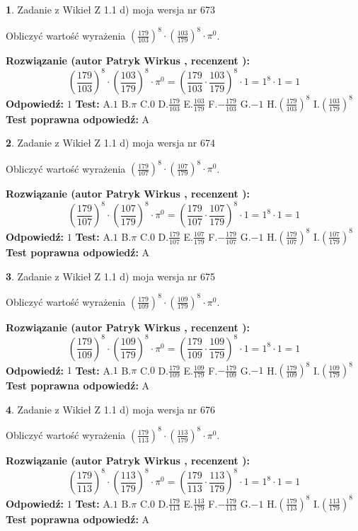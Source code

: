\documentclass[12pt, a4paper]{article}
\theoremstyle{definition} %
\newtheorem{zad}{}
\newcommand{\zadStart}[1]{\begin{zad}#1\newline}
\newcommand{\zadStop}{\end{zad}}
\newcommand{\rozwStart}[2]{\noindent \textbf{Rozwiązanie (autor #1 , recenzent #2): }\newline}
\newcommand{\rozwStop}{\newline}
\newcommand{\odpStart}{\noindent \textbf{Odpowiedź:}\newline}
\newcommand{\odpStop}{\newline}
\newcommand{\testStart}{\noindent \textbf{Test:}\newline}
\newcommand{\testStop}{\newline}
\newcommand{\kluczStart}{\noindent \textbf{Test poprawna odpowiedź:}\newline}
\newcommand{\kluczStop}{\newline}
\begin{document}
\zadStart{Zadanie z Wikieł Z 1.1 d) moja wersja nr 673}

Obliczyć wartość wyrażenia $(\frac{179}{103})^{8} \cdot (\frac{103}{179})^{8} \cdot \pi^{0}$.
\zadStop
\rozwStart{Patryk Wirkus}{}
$$(\frac{179}{103})^{8} \cdot (\frac{103}{179})^{8} \cdot \pi^{0} = (\frac{179}{103} \cdot \frac{103}{179})^{8} \cdot 1 = 1^{8} \cdot 1 = 1$$
\rozwStop
\odpStart
$1$
\odpStop
\testStart
A.$1$ B.$\pi$ C.$0$ D.$\frac{179}{103}$ E.$\frac{103}{179}$
F.$-\frac{179}{103}$ G.$-1$
H.$(\frac{179}{103})^{8}$
I.$(\frac{103}{179})^{8}$
\testStop
\kluczStart
A
\kluczStop



\zadStart{Zadanie z Wikieł Z 1.1 d) moja wersja nr 674}

Obliczyć wartość wyrażenia $(\frac{179}{107})^{8} \cdot (\frac{107}{179})^{8} \cdot \pi^{0}$.
\zadStop
\rozwStart{Patryk Wirkus}{}
$$(\frac{179}{107})^{8} \cdot (\frac{107}{179})^{8} \cdot \pi^{0} = (\frac{179}{107} \cdot \frac{107}{179})^{8} \cdot 1 = 1^{8} \cdot 1 = 1$$
\rozwStop
\odpStart
$1$
\odpStop
\testStart
A.$1$ B.$\pi$ C.$0$ D.$\frac{179}{107}$ E.$\frac{107}{179}$
F.$-\frac{179}{107}$ G.$-1$
H.$(\frac{179}{107})^{8}$
I.$(\frac{107}{179})^{8}$
\testStop
\kluczStart
A
\kluczStop



\zadStart{Zadanie z Wikieł Z 1.1 d) moja wersja nr 675}

Obliczyć wartość wyrażenia $(\frac{179}{109})^{8} \cdot (\frac{109}{179})^{8} \cdot \pi^{0}$.
\zadStop
\rozwStart{Patryk Wirkus}{}
$$(\frac{179}{109})^{8} \cdot (\frac{109}{179})^{8} \cdot \pi^{0} = (\frac{179}{109} \cdot \frac{109}{179})^{8} \cdot 1 = 1^{8} \cdot 1 = 1$$
\rozwStop
\odpStart
$1$
\odpStop
\testStart
A.$1$ B.$\pi$ C.$0$ D.$\frac{179}{109}$ E.$\frac{109}{179}$
F.$-\frac{179}{109}$ G.$-1$
H.$(\frac{179}{109})^{8}$
I.$(\frac{109}{179})^{8}$
\testStop
\kluczStart
A
\kluczStop



\zadStart{Zadanie z Wikieł Z 1.1 d) moja wersja nr 676}

Obliczyć wartość wyrażenia $(\frac{179}{113})^{8} \cdot (\frac{113}{179})^{8} \cdot \pi^{0}$.
\zadStop
\rozwStart{Patryk Wirkus}{}
$$(\frac{179}{113})^{8} \cdot (\frac{113}{179})^{8} \cdot \pi^{0} = (\frac{179}{113} \cdot \frac{113}{179})^{8} \cdot 1 = 1^{8} \cdot 1 = 1$$
\rozwStop
\odpStart
$1$
\odpStop
\testStart
A.$1$ B.$\pi$ C.$0$ D.$\frac{179}{113}$ E.$\frac{113}{179}$
F.$-\frac{179}{113}$ G.$-1$
H.$(\frac{179}{113})^{8}$
I.$(\frac{113}{179})^{8}$
\testStop
\kluczStart
A
\kluczStop
\end{document}
